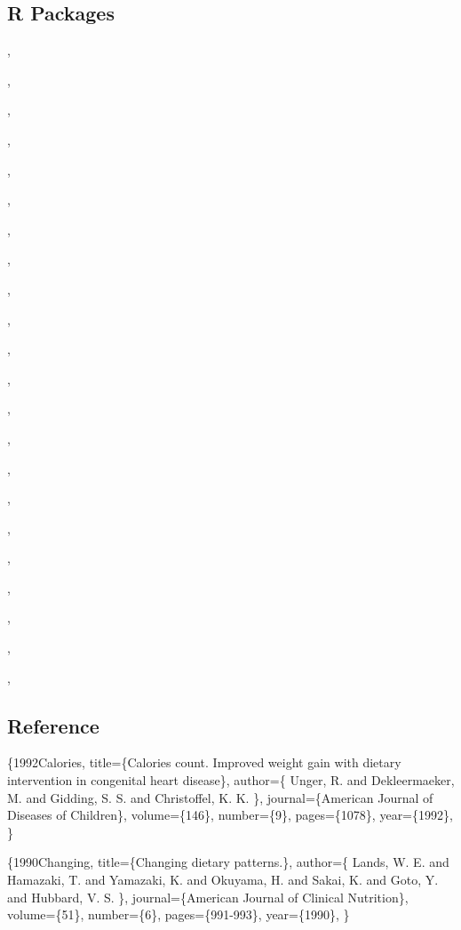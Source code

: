 \documentclass[11pt,a4paper,]{article}
\begin{document}
\newpage
\subsection*{R Packages}

\textcite{R-base}

\textcite{R-bookdown}
\textcite{R-citation}
\textcite{R-dplyr},

\textcite{R-forcats},

\textcite{R-ggplot2},

\textcite{R-kableExtra},

\textcite{R-knitr},

\textcite{R-naniar},

\textcite{R-patchwork},

\textcite{R-purrr},

\textcite{R-readr},

\textcite{R-scales},

\textcite{R-stringr},

\textcite{R-tibble},

\textcite{R-tidyr},

\textcite{R-tidyverse},

\textcite{R-tinytex},

\textcite{R-visdat},

\textcite{bookdown2016},

\textcite{ggplot22016},

\textcite{knitr2015},

\textcite{knitr2014},

\textcite{tidyverse2019},

\textcite{tinytex2019},

\textcite{visdat2017}

\newpage
\subsection*{Reference}

\textcite{article}\{1992Calories,
title=\{Calories count. Improved weight gain with dietary intervention in congenital heart disease\},
author=\{ Unger, R. and Dekleermaeker, M. and Gidding, S. S. and Christoffel, K. K. \},
journal=\{American Journal of Diseases of Children\},
volume=\{146\},
number=\{9\},
pages=\{1078\},
year=\{1992\},
\}

\textcite{article}\{1990Changing,
title=\{Changing dietary patterns.\},
author=\{ Lands, W. E. and Hamazaki, T. and Yamazaki, K. and Okuyama, H. and Sakai, K. and Goto, Y. and Hubbard, V. S. \},
journal=\{American Journal of Clinical Nutrition\},
volume=\{51\},
number=\{6\},
pages=\{991-993\},
year=\{1990\},
\}

\printbibliography
\end{document}
